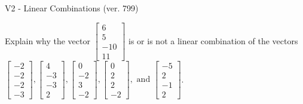 \begin{exercise}
  \begin{exerciseTitle}V2 - Linear Combinations (ver. 799)\end{exerciseTitle}
  \begin{exerciseStatement}
    Explain why the vector \(\left[\begin{array}{c}
6 \\
5 \\
-10 \\
11
\end{array}\right]\)  is or is not a linear 
	combination of the vectors \(\left[\begin{array}{c}
-2 \\
-2 \\
-2 \\
-3
\end{array}\right] , \left[\begin{array}{c}
4 \\
-3 \\
-3 \\
2
\end{array}\right] , \left[\begin{array}{c}
0 \\
-2 \\
3 \\
-2
\end{array}\right] , \left[\begin{array}{c}
0 \\
2 \\
2 \\
-2
\end{array}\right] , \text{ and } \left[\begin{array}{c}
-5 \\
2 \\
-1 \\
2
\end{array}\right]\).
	



\end{exerciseStatement}
\end{exercise}
